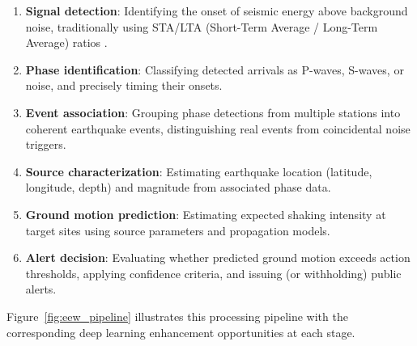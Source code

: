 \documentclass[review,authoryear]{elsarticle}
\begin{document}
\begin{enumerate}
\item \textbf{Signal detection}: Identifying the onset of seismic energy above background noise, traditionally using STA/LTA (Short-Term Average / Long-Term Average) ratios \citep{allen1978automatic, withers1998comparison}.
\item \textbf{Phase identification}: Classifying detected arrivals as P-waves, S-waves, or noise, and precisely timing their onsets.
\item \textbf{Event association}: Grouping phase detections from multiple stations into coherent earthquake events, distinguishing real events from coincidental noise triggers.
\item \textbf{Source characterization}: Estimating earthquake location (latitude, longitude, depth) and magnitude from associated phase data.
\item \textbf{Ground motion prediction}: Estimating expected shaking intensity at target sites using source parameters and propagation models.
\item \textbf{Alert decision}: Evaluating whether predicted ground motion exceeds action thresholds, applying confidence criteria, and issuing (or withholding) public alerts.
\end{enumerate}

Figure~\ref{fig:eew_pipeline} illustrates this processing pipeline with the corresponding deep learning enhancement opportunities at each stage.
\end{document}
